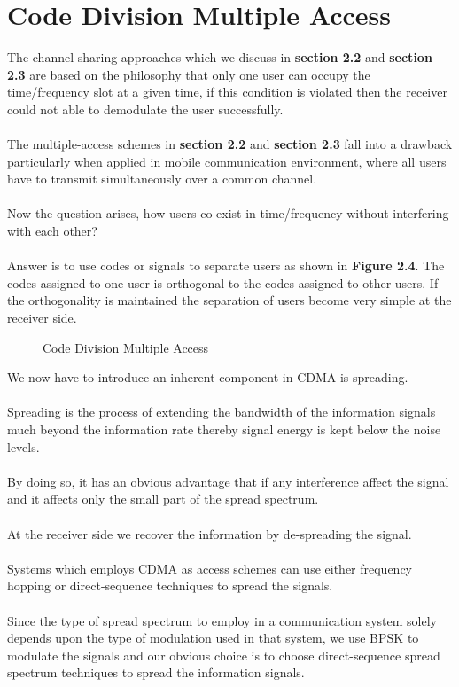 \section{Code Division Multiple Access}
The channel-sharing approaches which we discuss in \textbf{section 2.2} and \textbf{section 2.3} are based on the philosophy that only one user can occupy the time/frequency slot at a given time, if this condition is violated then the receiver could not able to demodulate the user successfully.\\ \\
The multiple-access schemes in \textbf{section 2.2} and \textbf{section 2.3} fall into a drawback particularly when applied in mobile communication environment, where all users have to transmit simultaneously over a common channel. \\ \\
Now the question arises, how users co-exist in time/frequency without interfering with each other? \\ \\
Answer is to use codes or signals to separate users as shown in \textbf{Figure 2.4}. The codes assigned to one user is orthogonal to the codes assigned to other users. If the orthogonality is maintained the separation of users become very simple at the receiver side.
\begin{figure}[htb]
  \centerline{  }
  \caption{Code Division Multiple Access}
\end{figure}
We now have to introduce an inherent component in CDMA is spreading. \\ \\
Spreading is the process of extending the bandwidth of the information signals much beyond the information rate thereby signal energy is kept below the noise levels. \\ \\
By doing so, it has an obvious advantage that if any interference affect the signal and it affects only the small part of the spread spectrum.\\ \\
At the receiver side we recover the information by de-spreading the signal.\\ \\
Systems which employs CDMA as access schemes can use either frequency hopping or direct-sequence techniques to spread the signals. \\ \\
Since the type of spread spectrum to employ in a communication system solely depends upon the type of modulation used in that system, we use BPSK to modulate the signals and our obvious choice is to choose direct-sequence spread spectrum techniques to spread the information signals.
